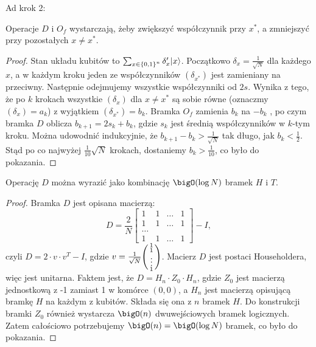 Ad krok 2:
\begin{proposition}
    Operacje \( D \) i \( O_f \) wystarczają, żeby zwiększyć współczynnik przy \( x^{*} \), a zmniejszyć przy pozostałych \( x \neq x^{*} \).
\end{proposition}
\begin{proof}
    Stan układu kubitów to \( \sum_{x \in \set{0,1}^n} \delta'_x |x\rangle \). Początkowo \( \delta_x = \frac{1}{\sqrt{N}} \) dla każdego \( x \),
    a w każdym kroku jeden ze współczynników \( (\delta_{x^{*}}) \) jest zamieniany na przeciwny. Następnie odejmujemy wszystkie współczynniki od \( 2s \).
    Wynika z tego, że po \( k \) krokach wszystkie \( (\delta_x) \) dla \( x \neq x^{*} \) są sobie równe (oznaczmy \( (\delta_x) = a_k \)) z wyjątkiem \( (\delta_{x^{*}}) = b_k \).
    Bramka \( O_f \) zamienia \( b_k \) na \( -b_k \) , po czym bramka \( D \) oblicza \( b_{k+1} = 2s_k + b_k \), gdzie \( s_k \) jest średnią współczynników w \( k \)-tym kroku.
    Można udowodnić indukcyjnie, że \( b_{k+1} - b_k > \frac{1}{\sqrt{N}} \) tak długo, jak \( b_k < \frac{1}{2} \).
    Stąd po co najwyżej \( \frac{1}{10} \sqrt{N} \) krokach, dostaniemy \( b_k > \frac{1}{10} \), co było do pokazania.
\end{proof}
\begin{proposition}
    Operację \( D \) można wyrazić jako kombinację \( \bigO(\log N) \) bramek \( H \) i \( T \).
\end{proposition}
\begin{proof}
    Bramka \( D \) jest opisana macierzą:
    \[
        D = \frac{2}{N}
        \begin{bmatrix}
        1 & 1 & \ldots & 1 \\
        1 & 1 & \ldots & 1 \\
        \ldots \\
        1 & 1 & \ldots & 1
        \end{bmatrix}
        - I,
    \]
    czyli \( D = 2 \cdot v \cdot v^T - I \), gdzie \( v = \frac{1}{\sqrt{N}}
    \pars{\begin{smallmatrix}
    1 \\
    1 \\
    \vdots \\
    1
    \end{smallmatrix}} \).
    Macierz \( D \) jest postaci Householdera, więc jest unitarna. Faktem jest, że \( D = H_n \cdot Z_0 \cdot H_n \), gdzie \( Z_0 \) jest macierzą jednostkową z -1 zamiast 1 w komórce \( (0,0) \),
    a \( H_n \) jest macierzą opisującą bramkę \( H \) na każdym z kubitów. Składa się ona z \( n \) bramek \( H \). Do konstrukcji bramki \( Z_0 \) również wystarcza \( \bigO(n) \) dwuwejściowych bramek logicznych.
    Zatem całościowo potrzebujemy \( \bigO(n) = \bigO(\log N) \) bramek, co było do pokazania.
\end{proof}